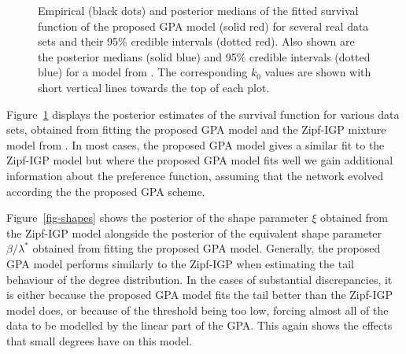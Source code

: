 \documentclass[
  sn-basic,
  10pt,
]{sn-jnl}
\theoremstyle{thmstyleone}
\theoremstyle{thmstyleone}
\theoremstyle{remark}
\theoremstyle{plain}
\theoremstyle{plain}
\theoremstyle{remark}
\begin{document}
\begin{figure}


\caption{\label{fig-real1}Empirical (black dots) and posterior medians
of the fitted survival function of the proposed GPA model (solid red)
for several real data sets and their 95\% credible intervals (dotted
red). Also shown are the posterior medians (solid blue) and 95\%
credible intervals (dotted blue) for a model from \citet{Lee24}. The
corresponding \(k_0\) values are shown with short vertical lines towards
the top of each plot.}

\end{figure}%

Figure~\ref{fig-real1} displays the posterior estimates of the survival
function for various data sets, obtained from fitting the proposed GPA
model and the Zipf-IGP mixture model from \citet{Lee24}. In most cases,
the proposed GPA model gives a similar fit to the Zipf-IGP model but
where the proposed GPA model fits well we gain additional information
about the preference function, assuming that the network evolved
according the the proposed GPA scheme.

Figure~\ref{fig-shapes} shows the posterior of the shape parameter
\(\xi\) obtained from the Zipf-IGP model alongside the posterior of the
equivalent shape parameter \(\beta/\lambda^*\) obtained from fitting the
proposed GPA model. Generally, the proposed GPA model performs similarly
to the Zipf-IGP when estimating the tail behaviour of the degree
distribution. In the cases of substantial discrepancies, it is either
because the proposed GPA model fits the tail better than the Zipf-IGP
model does, or because of the threshold being too low, forcing almost
all of the data to be modelled by the linear part of the GPA. This again
shows the effects that small degrees have on this model.
\end{document}

